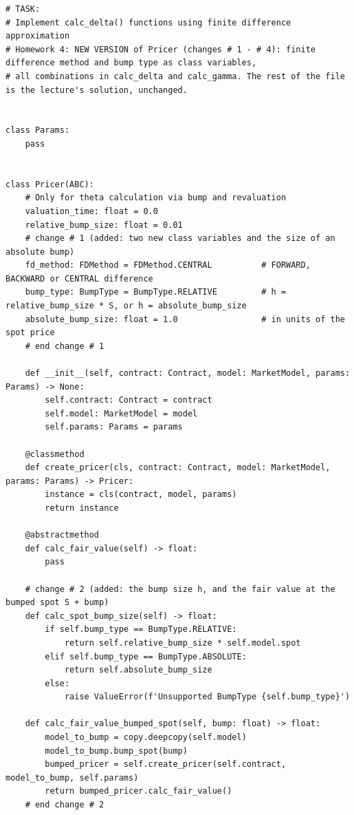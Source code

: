 \documentclass[11pt,a4paper]{article}
\begin{document}
\begin{lstlisting}[style=pysmall]
# TASK:
# Implement calc_delta() functions using finite difference approximation
# Homework 4: NEW VERSION of Pricer (changes # 1 - # 4): finite difference method and bump type as class variables,
# all combinations in calc_delta and calc_gamma. The rest of the file is the lecture's solution, unchanged.


class Params:
    pass


class Pricer(ABC):
    # Only for theta calculation via bump and revaluation
    valuation_time: float = 0.0
    relative_bump_size: float = 0.01
    # change # 1 (added: two new class variables and the size of an absolute bump)
    fd_method: FDMethod = FDMethod.CENTRAL          # FORWARD, BACKWARD or CENTRAL difference
    bump_type: BumpType = BumpType.RELATIVE         # h = relative_bump_size * S, or h = absolute_bump_size
    absolute_bump_size: float = 1.0                 # in units of the spot price
    # end change # 1

    def __init__(self, contract: Contract, model: MarketModel, params: Params) -> None:
        self.contract: Contract = contract
        self.model: MarketModel = model
        self.params: Params = params

    @classmethod
    def create_pricer(cls, contract: Contract, model: MarketModel, params: Params) -> Pricer:
        instance = cls(contract, model, params)
        return instance

    @abstractmethod
    def calc_fair_value(self) -> float:
        pass

    # change # 2 (added: the bump size h, and the fair value at the bumped spot S + bump)
    def calc_spot_bump_size(self) -> float:
        if self.bump_type == BumpType.RELATIVE:
            return self.relative_bump_size * self.model.spot
        elif self.bump_type == BumpType.ABSOLUTE:
            return self.absolute_bump_size
        else:
            raise ValueError(f'Unsupported BumpType {self.bump_type}')

    def calc_fair_value_bumped_spot(self, bump: float) -> float:
        model_to_bump = copy.deepcopy(self.model)
        model_to_bump.bump_spot(bump)
        bumped_pricer = self.create_pricer(self.contract, model_to_bump, self.params)
        return bumped_pricer.calc_fair_value()
    # end change # 2


\end{lstlisting}
\end{document}
